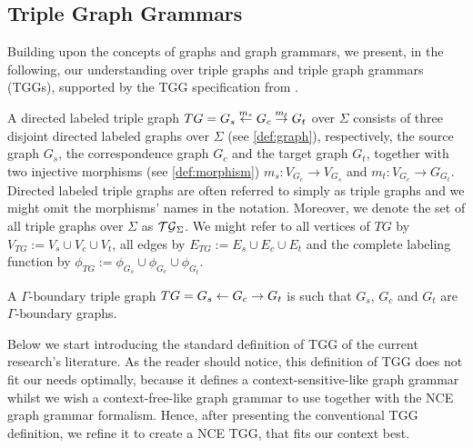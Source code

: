 \documentclass[]{report}
\begin{document}

\subsection{Triple Graph Grammars}
Building upon the concepts of graphs and graph grammars, we present, in the following, our understanding over triple graphs and triple graph grammars (TGGs), supported by the TGG specification from \cite{schurr1994specification}.


\begin{definition}
	A directed labeled triple graph $TG = G_s \overset{m_s}{\leftarrow} G_c \overset{m_t}{\rightarrow} G_t$ over $\Sigma$ consists of three disjoint directed labeled graphs over $\Sigma$ (see \ref{def:graph}), respectively, the source graph $G_s$, the correspondence graph $G_c$ and the target graph $G_t$, together with two injective morphisms (see \ref{def:morphism}) $m_s: V_{G_c} \to V_{G_s}$ and $m_t : V_{G_c} \to G_{G_t}$. Directed labeled triple graphs are often referred to simply as triple graphs and we might omit the morphisms' names in the notation. Moreover, we denote the set of all triple graphs over $\Sigma$ as $\mathcal{TG}_{\Sigma}$. We might refer to all vertices of $TG$ by $V_{TG}:= V_s \cup V_c \cup V_t$, all edges by $E_{TG}:= E_s \cup E_c \cup E_t$ and the complete labeling function by $\phi_{TG}:= \phi_{G_s} \cup \phi_{G_c} \cup \phi_{G_t}$.
\end{definition}

\begin{definition}
	A $\Gamma\text{-boundary}$ triple graph $TG = G_s \overset{}{\leftarrow} G_c \overset{}{\rightarrow} G_t$ is such that $G_s$, $G_c$ and $G_t$ are $\Gamma\text{-boundary}$ graphs.
\end{definition}


Below we start introducing the standard definition of TGG of the current research's literature. As the reader should notice, this definition of TGG does not fit our needs optimally, because it defines a context-sensitive-like graph grammar whilst we wish a context-free-like graph grammar to use together with the NCE graph grammar formalism. Hence, after presenting the conventional TGG definition, we refine it to create a NCE TGG, that fits our context best.
\end{document}
